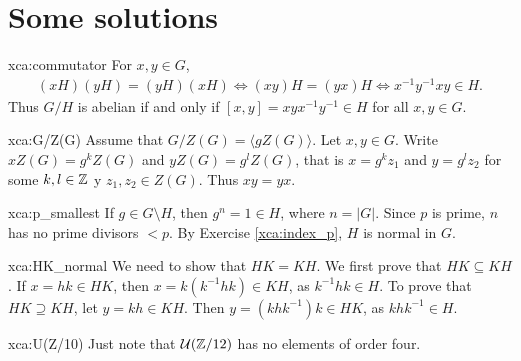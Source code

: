 \chapter*{Some solutions}

\pagestyle{plain}
\fancyhf{}
\fancyfoot[CE,CO]{\leftmark}
\fancyfoot[LE,RO]{\thepage}


\begin{sol}{xca:commutator}
For $x,y\in G$,
\begin{align*}
    (xH)(yH)=(yH)(xH) \Longleftrightarrow (xy)H=(yx)H \Longleftrightarrow x^{-1}y^{-1}xy\in H.
\end{align*}
Thus $G/H$ is abelian if and only if  $[x,y]=xyx^{-1}y^{-1}\in H$ for all $x,y\in G$.
\end{sol}


\begin{sol}{xca:G/Z(G)}
Assume that $G/Z(G)=\langle gZ(G)\rangle$. Let $x,y\in G$. 
Write $xZ(G)=g^kZ(G)$ and $yZ(G)=g^lZ(G)$, 
that is 
$x=g^kz_1$ and $y=g^lz_2$ for some $k,l\in\mathbb{Z}$ y $z_1,z_2\in Z(G)$. Thus $xy=yx$.
\end{sol}

\begin{sol}{xca:p_smallest}
    If $g\in G\setminus H$, then $g^n=1\in H$, where $n=|G|$. Since $p$ is prime, $n$ has no prime divisors $<p$. By Exercise \ref{xca:index_p}, $H$ is normal in $G$.
\end{sol}

\begin{sol}{xca:HK_normal}
We need to show that $HK=KH$. We first prove that
$HK\subseteq KH$. If $x=hk\in HK$, then
 $x=k(k^{-1}hk)\in KH$, as $k^{-1}hk\in H$. To prove 
that $HK\supseteq KH$, let $y=kh\in KH$. Then $y=(khk^{-1})k\in HK$, as  $khk^{-1}\in H$. 
\end{sol}

\begin{sol}{xca:U(Z/10)}
Just note that $\mathcal{U}(\mathbb{Z}/12)$ has no elements of order four.
\end{sol}